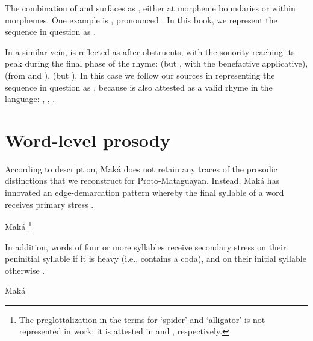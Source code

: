 The combination of  and  surfaces as , either at morpheme boundaries or within morphemes. One example is , pronounced . In this book, we represent the sequence in question as .

In a similar vein,  is reflected as  after obstruents, with the sonority reaching its peak during the final phase of the rhyme:   (but , with the benefactive applicative),  (from  and ),  (but ). In this case we follow our sources in representing the sequence in question as , because  is also attested as a valid rhyme in the language: , ,  \citep{AG99}.

\section{Word-level prosody}\label{mk-prosody}

According to  description, Maká does not retain any traces of the prosodic distinctions that we reconstruct for Proto-Mataguayan. Instead, Maká has innovated an edge-demarcation pattern whereby the final syllable of a word receives primary stress .

\ea\label{mk-stress}
    Maká \citep[67–68]{AG89}\footnote{The preglottalization in the terms for `spider' and `alligator' is not represented in  work; it is attested in \citet[16]{PMA} and \citet[71]{JB81}, respectively.}
    \begin{xlist}
        \ex {}
        \ex {}
        \ex {}
        \ex {}
        \ex {}
        \ex {}
        \ex {}
        \ex {}
    \end{xlist}
\z

In addition, words of four or more syllables receive secondary stress on their peninitial syllable if it is heavy (i.e., contains a coda), and on their initial syllable otherwise \citep[68]{AG89}. 

\ea\label{mk-sec-stress}
    Maká \citep[69]{AG94}
    \begin{xlist}
        \ex {}
        \ex {}
        \ex {}
        \ex {}
        \ex {}
        \ex {}
        \ex {}
    \end{xlist}
\z
{}
